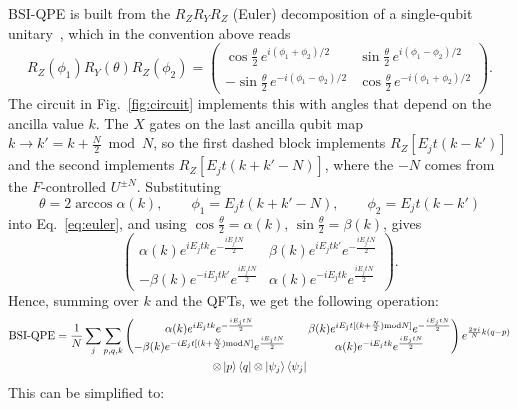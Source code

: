 \documentclass[aps,floatfix,10pt,amssymb,amsfont,amsmath,superscriptaddress,float,nofootinbib,longbibliography,nobalancelastpage,twocolumn]{revtex4-2}
\begin{document}
\begin{widetext}
BSI-QPE is built from the $R_ZR_YR_Z$ (Euler) decomposition of a single-qubit unitary~\cite{Nielsen_Chuang_2010}, which in the convention above reads
\begin{equation}
\label{eq:euler}
R_Z(\phi_1)R_Y(\theta)R_Z(\phi_2) = \begin{pmatrix}
\cos\frac{\theta}{2}\,e^{i(\phi_1+\phi_2)/2} & \sin\frac{\theta}{2}\,e^{i(\phi_1-\phi_2)/2}\\
-\sin\frac{\theta}{2}\,e^{-i(\phi_1-\phi_2)/2} & \cos\frac{\theta}{2}\,e^{-i(\phi_1+\phi_2)/2}
\end{pmatrix}.
\end{equation}
The circuit in Fig.~\ref{fig:circuit} implements this with angles that depend on the ancilla value $k$. The $X$ gates on the last ancilla qubit map $k\to k' = k+\frac{N}{2} \bmod N$, so the first dashed block implements $R_Z[E_jt(k-k')]$ and the second implements $R_Z[E_jt(k+k'-N)]$, where the $-N$ comes from the $F$-controlled $U^{\pm N}$. Substituting
\begin{equation}
\label{eq:angles}
\theta = 2\arccos\alpha(k),\qquad \phi_1 = E_jt(k+k'-N),\qquad \phi_2 = E_jt(k-k')
\end{equation}
into Eq.~\eqref{eq:euler}, and using $\cos\frac{\theta}{2}=\alpha(k)$, $\sin\frac{\theta}{2}=\beta(k)$, gives
\begin{equation}
\begin{pmatrix}
\alpha(k)e^{iE_jtk}e^{-\frac{iE_jtN}{2}} & \beta(k)e^{iE_jt k'}e^{-\frac{iE_jtN}{2}}\\
-\beta(k)e^{-iE_jt k'}e^{\frac{iE_jtN}{2}} & \alpha(k)e^{-iE_jtk}e^{\frac{iE_jtN}{2}}
\end{pmatrix}.
\end{equation}
Hence, summing over $k$ and the QFTs, we get the following operation:
\begin{multline}
        \text{BSI-QPE} = \frac{1}{N}\sum_j\sum_{p,q,k} \begin{pmatrix}
        \alpha(k)e^{iE_jtk}e^{-\frac{iE_jtN}{2}} && \beta(k)e^{iE_jt[(k+\frac{N}{2})\text{mod} N]}e^{-\frac{iE_jtN}{2}}\\
        -\beta (k)e^{-iE_jt[(k+\frac{N}{2})\text{mod} N]}e^{\frac{iE_jtN}{2}} && \alpha(k)e^{-iE_jtk}e^{\frac{iE_jtN}{2}}
    \end{pmatrix}e^{\frac{2\pi i}{N}k(q-p)} \\\otimes\ket{p}\bra{q}\otimes\ket{\psi_j}\bra{\psi_j}
\end{multline}
This can be simplified to:

\end{widetext}
\end{document}
